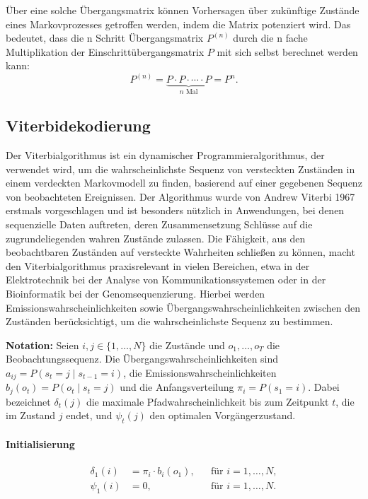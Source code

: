 Über eine solche Übergangsmatrix können Vorhersagen über zukünftige Zustände eines Markovprozesses getroffen werden, indem die Matrix potenziert wird.
Das bedeutet, dass die n Schritt Übergangsmatrix $P^{(n)}$ durch die n fache Multiplikation der Einschrittübergangsmatrix $P$ mit sich selbst berechnet werden kann:
\begin{equation}
P^{(n)} = \underbrace{P \cdot P \cdot \cdots \cdot P}_{n \text{ Mal}} = P^n.
\end{equation} 


\subsection{Viterbidekodierung}

Der Viterbialgorithmus ist ein dynamischer Programmieralgorithmus, der verwendet wird, um die wahrscheinlichste Sequenz von versteckten Zuständen in einem verdeckten Markovmodell zu finden, basierend auf einer gegebenen Sequenz von beobachteten Ereignissen. Der Algorithmus wurde von Andrew Viterbi 1967 \cite{viterbierror} erstmals vorgeschlagen und ist besonders nützlich in Anwendungen, bei denen sequenzielle Daten auftreten, deren Zusammensetzung Schlüsse auf die zugrundeliegenden wahren Zustände zulassen. Die Fähigkeit, aus den beobachtbaren Zuständen auf versteckte Wahrheiten schließen zu können, macht den Viterbialgorithmus praxisrelevant in vielen Bereichen, etwa in der Elektrotechnik bei der Analyse von Kommunikationssystemen oder in der Bioinformatik bei der Genomsequenzierung.
Hierbei werden Emissionswahrscheinlichkeiten sowie Übergangswahrscheinlichkeiten zwischen den Zuständen berücksichtigt, um die wahrscheinlichste Sequenz zu bestimmen.

\medskip
\textbf{Notation:} 
Seien $i, j \in \{1, \ldots, N\}$ die Zustände und $o_1, \ldots, o_T$ die Beobachtungssequenz.
Die Übergangswahrscheinlichkeiten sind $a_{ij} = P(s_t = j \mid s_{t-1} = i)$,
die Emissionswahrscheinlichkeiten $b_j(o_t) = P(o_t \mid s_t = j)$ und
die Anfangsverteilung $\pi_i = P(s_1 = i)$.
Dabei bezeichnet $\delta_t(j)$ die maximale Pfadwahrscheinlichkeit bis zum Zeitpunkt $t$, die im Zustand $j$ endet,
und $\psi_t(j)$ den optimalen Vorgängerzustand.

\paragraph{Initialisierung}
\begin{align}
  \delta_1(i) &= \pi_i \cdot b_i(o_1), && \text{für } i = 1, \ldots, N, \\
  \psi_1(i)   &= 0,                   && \text{für } i = 1, \ldots, N.
\end{align}


